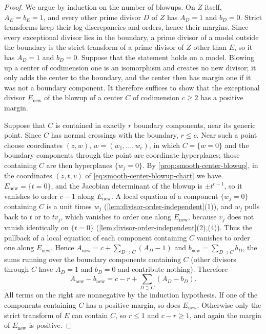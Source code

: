 \begin{proof}
We argue by induction on the number of blowups. On $Z$ itself, $A_E=b_E=1$, and every other prime divisor $D$ of $Z$ has $A_D=1$ and $b_D=0$. Strict transforms keep their log discrepancies and orders, hence their margins. Since every exceptional divisor lies in the boundary, a prime divisor of a model outside the boundary is the strict transform of a prime divisor of $Z$ other than $E$, so it has $A_D=1$ and $b_D=0$. Suppose that the statement holds on a model. Blowing up a center of codimension one is an isomorphism and creates no new divisor; it only adds the center to the boundary, and the center then has margin one if it was not a boundary component. It therefore suffices to show that the exceptional divisor $E_{\mathrm{new}}$ of the blowup of a center $C$ of codimension $c\geq2$ has a positive margin.

Suppose that $C$ is contained in exactly $r$ boundary components, near its generic point. Since $C$ has normal crossings with the boundary, $r\leq c$. Near such a point choose coordinates $(z,w)$, $w=(w_1,\ldots,w_c)$, in which $C=\{w=0\}$ and the boundary components through the point are coordinate hyperplanes; those containing $C$ are then hyperplanes $\{w_j=0\}$. By \cref{prop:smooth-center-blowup}, in the coordinates $(z,t,v)$ of \eqref{eq:smooth-center-blowup-chart} we have $E_{\mathrm{new}}=\{t=0\}$, and the Jacobian determinant of the blowup is $\pm t^{c-1}$, so it vanishes to order $c-1$ along $E_{\mathrm{new}}$. A local equation of a component $\{w_j=0\}$ containing $C$ is a unit times $w_j$ (\cref{lem:divisor-order-independent}(1)), and $w_j$ pulls back to $t$ or to $tv_j$, which vanishes to order one along $E_{\mathrm{new}}$, because $v_j$ does not vanish identically on $\{t=0\}$ (\cref{lem:divisor-order-independent}(2),(4)). Thus the pullback of a local equation of each component containing $C$ vanishes to order one along $E_{\mathrm{new}}$. Hence $A_{\mathrm{new}}=c+\sum_{D\supset C}(A_D-1)$ and $b_{\mathrm{new}}=\sum_{D\supset C}b_D$, the sums running over the boundary components containing $C$ (other divisors through $C$ have $A_D=1$ and $b_D=0$ and contribute nothing). Therefore
\[
 A_{\mathrm{new}}-b_{\mathrm{new}}
       =c-r+\sum_{D\supset C}(A_D-b_D).
\]
All terms on the right are nonnegative by the induction hypothesis. If one of the components containing $C$ has a positive margin, so does $E_{\mathrm{new}}$. Otherwise only the strict transform of $E$ can contain $C$, so $r\leq1$ and $c-r\geq1$, and again the margin of $E_{\mathrm{new}}$ is positive.
\end{proof}

